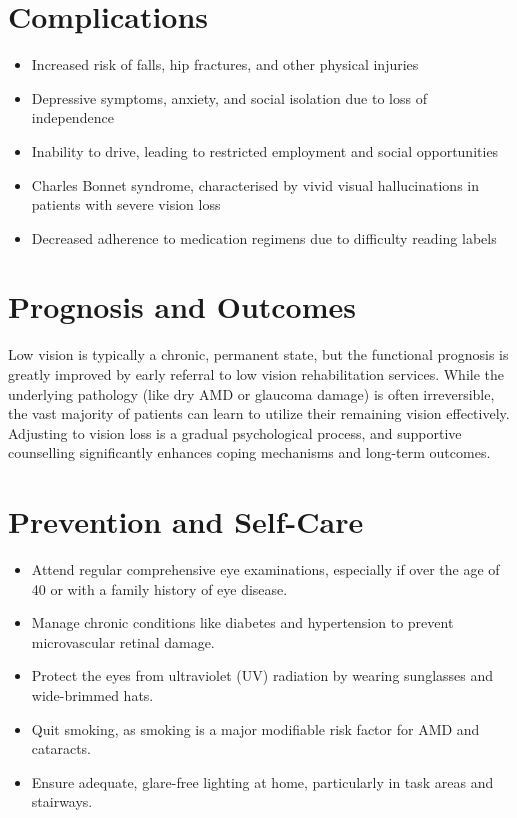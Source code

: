 \section*{Complications}
\begin{itemize}
    \item Increased risk of falls, hip fractures, and other physical injuries
    \item Depressive symptoms, anxiety, and social isolation due to loss of independence
    \item Inability to drive, leading to restricted employment and social opportunities
    \item Charles Bonnet syndrome, characterised by vivid visual hallucinations in patients with severe vision loss
    \item Decreased adherence to medication regimens due to difficulty reading labels
\end{itemize}

\section*{Prognosis and Outcomes}
Low vision is typically a chronic, permanent state, but the functional prognosis is greatly improved by early referral to low vision rehabilitation services. While the underlying pathology (like dry AMD or glaucoma damage) is often irreversible, the vast majority of patients can learn to utilize their remaining vision effectively. Adjusting to vision loss is a gradual psychological process, and supportive counselling significantly enhances coping mechanisms and long-term outcomes.

\section*{Prevention and Self-Care}
\begin{itemize}
    \item Attend regular comprehensive eye examinations, especially if over the age of 40 or with a family history of eye disease.
    \item Manage chronic conditions like diabetes and hypertension to prevent microvascular retinal damage.
    \item Protect the eyes from ultraviolet (UV) radiation by wearing sunglasses and wide-brimmed hats.
    \item Quit smoking, as smoking is a major modifiable risk factor for AMD and cataracts.
    \item Ensure adequate, glare-free lighting at home, particularly in task areas and stairways.
\end{itemize}

